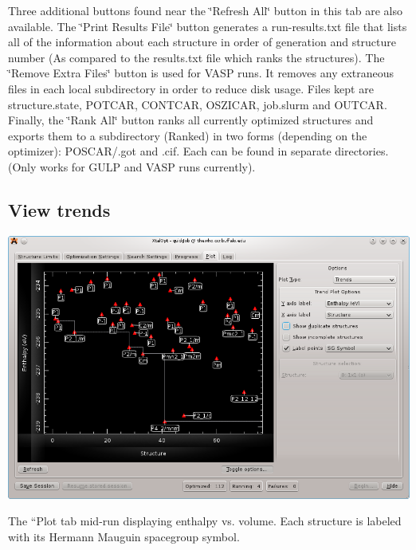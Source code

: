 Three additional buttons found near the \char`\"{}\+Refresh All\char`\"{} button in this tab are also available. The \char`\"{}\+Print Results File\char`\"{} button generates a run-\/results.\+txt file that lists all of the information about each structure in order of generation and structure number (As compared to the results.\+txt file which ranks the structures). The \char`\"{}\+Remove Extra Files\char`\"{} button is used for V\+A\+S\+P runs. It removes any extraneous files in each local subdirectory in order to reduce disk usage. Files kept are structure.\+state, P\+O\+T\+C\+A\+R, C\+O\+N\+T\+C\+A\+R, O\+S\+Z\+I\+C\+A\+R, job.\+slurm and O\+U\+T\+C\+A\+R. Finally, the \char`\"{}\+Rank All\char`\"{} button ranks all currently optimized structures and exports them to a subdirectory (Ranked) in two forms (depending on the optimizer)\+: P\+O\+S\+C\+A\+R/.got and .cif. Each can be found in separate directories. (Only works for G\+U\+L\+P and V\+A\+S\+P runs currently).\hypertarget{tut-xo_trends}{}\subsection{View trends}\label{tut-xo_trends}

\begin{DoxyImage}
\includegraphics[width=\textwidth]{trend-view.png}
\caption{The ``\+Plot\textquotesingle{}\textquotesingle{} tab mid-\/run displaying enthalpy vs. volume. Each structure is labeled with its Hermann Mauguin spacegroup symbol.}
\end{DoxyImage}


